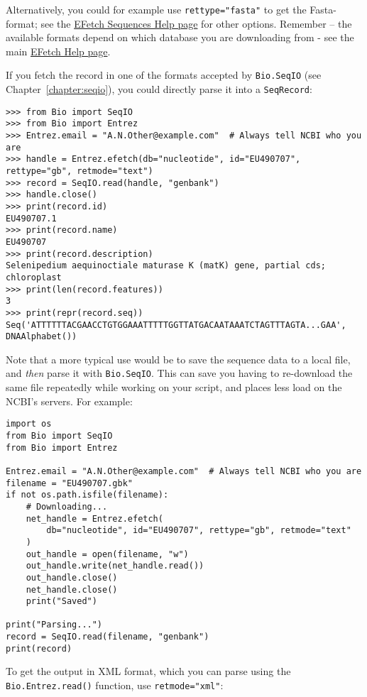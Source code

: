 Alternatively, you could for example use \verb+rettype="fasta"+ to get the Fasta-format; see the \href{https://www.ncbi.nlm.nih.gov/books/NBK25499/#chapter4.EFetch}{EFetch Sequences Help page} for other options. Remember -- the available formats depend on which database you are downloading from - see the main \href{https://www.ncbi.nlm.nih.gov/books/NBK25499/#chapter4.EFetch}{EFetch Help page}.

If you fetch the record in one of the formats accepted by \verb+Bio.SeqIO+ (see Chapter~\ref{chapter:seqio}), you could directly parse it into a \verb+SeqRecord+:

\begin{verbatim}
>>> from Bio import SeqIO
>>> from Bio import Entrez
>>> Entrez.email = "A.N.Other@example.com"  # Always tell NCBI who you are
>>> handle = Entrez.efetch(db="nucleotide", id="EU490707", rettype="gb", retmode="text")
>>> record = SeqIO.read(handle, "genbank")
>>> handle.close()
>>> print(record.id)
EU490707.1
>>> print(record.name)
EU490707
>>> print(record.description)
Selenipedium aequinoctiale maturase K (matK) gene, partial cds; chloroplast
>>> print(len(record.features))
3
>>> print(repr(record.seq))
Seq('ATTTTTTACGAACCTGTGGAAATTTTTGGTTATGACAATAAATCTAGTTTAGTA...GAA', DNAAlphabet())
\end{verbatim}

Note that a more typical use would be to save the sequence data to a local file, and \emph{then} parse it with \verb|Bio.SeqIO|.  This can save you having to re-download the same file repeatedly while working on your script, and places less load on the NCBI's servers.  For example:

\begin{verbatim}
import os
from Bio import SeqIO
from Bio import Entrez

Entrez.email = "A.N.Other@example.com"  # Always tell NCBI who you are
filename = "EU490707.gbk"
if not os.path.isfile(filename):
    # Downloading...
    net_handle = Entrez.efetch(
        db="nucleotide", id="EU490707", rettype="gb", retmode="text"
    )
    out_handle = open(filename, "w")
    out_handle.write(net_handle.read())
    out_handle.close()
    net_handle.close()
    print("Saved")

print("Parsing...")
record = SeqIO.read(filename, "genbank")
print(record)
\end{verbatim}

To get the output in XML format, which you can parse using the \verb+Bio.Entrez.read()+ function, use \verb+retmode="xml"+:

